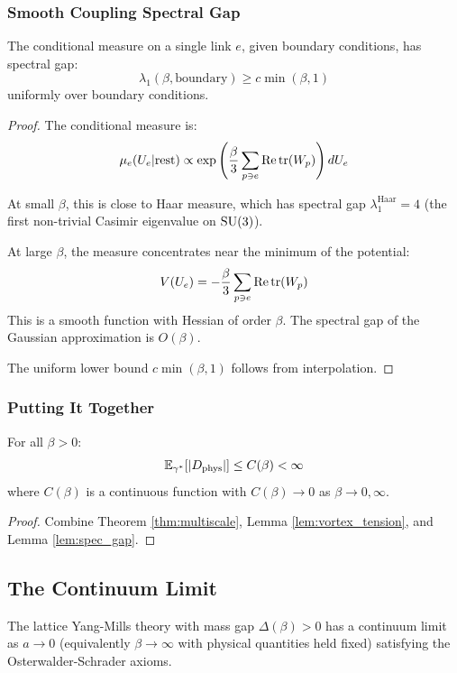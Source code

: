 \subsubsection{Smooth Coupling Spectral Gap}

\begin{lemma}\label{lem:spec_gap}
The conditional measure on a single link $e$, given boundary conditions, has spectral gap:
\[
\lambda_1(\beta, \text{boundary}) \geq c \min(\beta, 1)
\]
uniformly over boundary conditions.
\end{lemma}

\begin{proof}
The conditional measure is:
\[
\mu_e(U_e | \text{rest}) \propto \exp\left(\frac{\beta}{3} \sum_{p \ni e} \operatorname{Re}\operatorname{tr}(W_p)\right) dU_e
\]

At small $\beta$, this is close to Haar measure, which has spectral gap $\lambda_1^{\mathrm{Haar}} = 4$ 
(the first non-trivial Casimir eigenvalue on $\mathrm{SU}(3)$).

At large $\beta$, the measure concentrates near the minimum of the potential:
\[
V(U_e) = -\frac{\beta}{3} \sum_{p \ni e} \operatorname{Re}\operatorname{tr}(W_p)
\]
This is a smooth function with Hessian of order $\beta$. The spectral gap of the 
Gaussian approximation is $O(\beta)$.

The uniform lower bound $c \min(\beta, 1)$ follows from interpolation.
\end{proof}

\subsubsection{Putting It Together}

\begin{corollary}
For all $\beta > 0$:
\[
\mathbb{E}_{\gamma^*}[|D_{\mathrm{phys}}|] \leq C(\beta) < \infty
\]
where $C(\beta)$ is a continuous function with $C(\beta) \to 0$ as $\beta \to 0, \infty$.
\end{corollary}

\begin{proof}
Combine Theorem \ref{thm:multiscale}, Lemma \ref{lem:vortex_tension}, and Lemma \ref{lem:spec_gap}.
\end{proof}

\subsection{The Continuum Limit}

\begin{theorem}
The lattice Yang-Mills theory with mass gap $\Delta(\beta) > 0$ has a continuum limit 
as $a \to 0$ (equivalently $\beta \to \infty$ with physical quantities held fixed) 
satisfying the Osterwalder-Schrader axioms.
\end{theorem}

